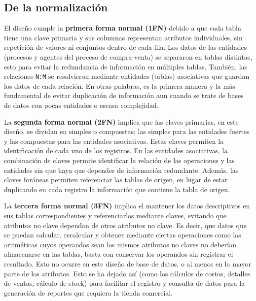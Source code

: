\documentclass[11pt]{article}
\begin{document}
\subsection*{\centering De la normalización}

El diseño cumple la \textbf{primera forma normal (1FN)} debido a que cada tabla tiene una clave primaria y sus columnas representan atributos individuales, sin repetición de valores ni conjuntos dentro de cada fila. Los datos de las entidades (procesos y agentes del proceso de compra-venta) se separaron en tablas distintas, esto para evitar la redundancia de información en múltiples tablas. También, las relaciones \texttt{N:M} se resolvieron mediante entidades (tablas) asociativas que guardan los datos de cada relación. En otras palabras, es la primera manera y la más fundamental de evitar duplicación de información aun cuando se trate de bases de datos con pocas entidades o escasa complejidad.
\newline

La \textbf{segunda forma normal (2FN)} implica que las claves primarias, en este diseño, se dividan en simples o compuestas; las simples para las entidades fuertes y las compuestas para las entidades asociativas. Estas claves permiten la identificación de cada uno de los registros. En las entidades asociativas, la combinación de claves permite identificar la relación de las operaciones y las entidades sin que haya que depender de información redundante. Además, las claves foráneas permiten referenciar las tablas de origen, en lugar de estar duplicando en cada registro la información que contiene la tabla de origen.
\newline

La \textbf{tercera forma normal (3FN)} implica el mantener los datos descriptivos en sus tablas correspondientes y referenciarlos mediante claves, evitando que atributos no clave dependan de otros atributos no clave. Es decir, que datos que se puedan calcular, recalcular y obtener mediante ciertas operaciones como las aritméticas cuyos operandos sean los mismos atributos no claves no deberían almacenarse en las tablas, basta con conservar los operandos sin registrar el resultado. Esto no ocurre en este diseño de base de datos, o al menos en la mayor parte de los atributos. Esto se ha dejado así (como los cálculos de costos, detalles de ventas, cálculo de stock) para facilitar el registro y consulta de datos para la generación de reportes que requiera la tienda comercial.
\newline
\end{document}
